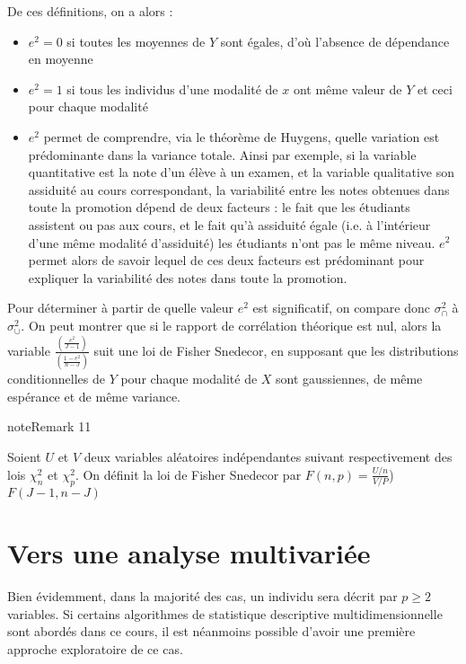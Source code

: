 \documentclass[letterpaper,10pt,english]{jupyterBook}
\begin{document}
\sphinxAtStartPar
De ces définitions, on a alors :
\begin{itemize}
\item {} 
\sphinxAtStartPar
\(e^2=0\) si toutes les moyennes de \(Y\) sont égales, d’où l’absence de dépendance en moyenne

\item {} 
\sphinxAtStartPar
\(e^2=1\) si tous les individus d’une modalité de \(x\) ont même valeur de \(Y\) et ceci pour chaque modalité

\item {} 
\sphinxAtStartPar
\(e^2\) permet de comprendre, via le théorème de Huygens,  quelle variation est prédominante dans la variance totale. Ainsi par exemple, si la variable quantitative est la note d’un élève à un examen, et la variable qualitative son assiduité au cours correspondant, la variabilité entre les notes obtenues dans toute la promotion dépend de deux
facteurs : le fait que les étudiants assistent ou pas aux cours, et le fait qu’à assiduité
égale (i.e. à l’intérieur d’une même modalité d’assiduité) les étudiants n’ont pas le même niveau. \(e^2\)  permet alors de savoir lequel de ces deux facteurs est prédominant
pour expliquer la variabilité des notes dans toute la promotion.

\end{itemize}

\sphinxAtStartPar
Pour déterminer à partir de quelle valeur \(e^2\) est significatif, on compare donc \(\sigma^2_\cap\) à \(\sigma^2_\cup\). On peut montrer que si le rapport de corrélation théorique est nul, alors la variable \(\frac{\left (\frac{e^2}{J-1}\right )}{\left (\frac{1-e^2}{n-J}\right )}\) suit une loi de Fisher Snedecor, en supposant que les distributions conditionnelles de \(Y\) pour chaque modalité de \(X\) sont gaussiennes, de même espérance et de même variance.
\label{statsdescriptives:remark-22}
\begin{sphinxadmonition}{note}{Remark 11}



\sphinxAtStartPar
Soient \(U\) et \(V\) deux variables aléatoires indépendantes suivant respectivement des lois \(\chi^2_n\) et \(\chi^2_p\). On définit la loi de Fisher Snedecor par \(F(n,p)=\frac{U/n}{V/P}\)) \(F(J-1,n-J)\)
\end{sphinxadmonition}


\section{Vers une analyse multivariée}
\label{\detokenize{statsdescriptives:vers-une-analyse-multivariee}}
\sphinxAtStartPar
Bien évidemment, dans la majorité des cas, un individu sera décrit par \(p\geq 2\) variables. Si certains algorithmes de statistique descriptive multidimensionnelle sont abordés dans ce cours, il est néanmoins possible d’avoir une première approche exploratoire de ce cas.
\end{document}
